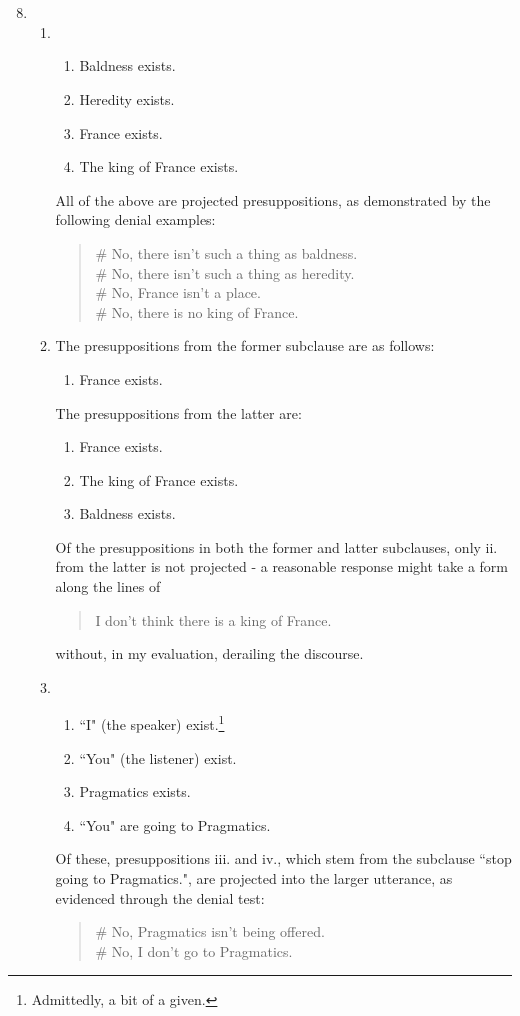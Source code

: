 \documentclass[12pt,a4paper]{article}
\begin{document}
\part{}
\begin{enumerate}
\setcounter{enumi}{7}
\item 
\begin{enumerate}

\item 
\begin{enumerate}
\item Baldness exists.
\item Heredity exists.
\item France exists.
\item The king of France exists.
\end{enumerate}
All of the above are projected presuppositions, as demonstrated by the following denial examples:
\begin{quote}
\# No, there isn't such a thing as baldness.\\
\# No, there isn't such a thing as heredity.\\
\# No, France isn't a place.\\
\# No, there is no king of France.
\end{quote}

\item
The presuppositions from the former subclause are as follows:
\begin{enumerate}
\item France exists.
\end{enumerate}
The presuppositions from the latter are:
\begin{enumerate}
\item France exists.
\item The king of France exists.
\item Baldness exists.
\end{enumerate}
Of the presuppositions in both the former and latter subclauses, only ii. from the latter is not projected - a reasonable response might take a form along the lines of
\begin{quote}
I don't think there is a king of France.
\end{quote}
without, in my evaluation, derailing the discourse.

\item
\begin{enumerate}
\item ``I" (the speaker) exist.\footnote{Admittedly, a bit of a given.}
\item ``You" (the listener) exist.
\item Pragmatics exists.
\item ``You" are going to Pragmatics.
\end{enumerate}
Of these, presuppositions iii. and iv., which stem from the subclause ``stop going to Pragmatics.", are projected into the larger utterance, as evidenced through the denial test:
\begin{quote}
\# No, Pragmatics isn't being offered.\\
\# No, I don't go to Pragmatics.
\end{quote}


\end{enumerate}
\end{enumerate}
\end{document}
